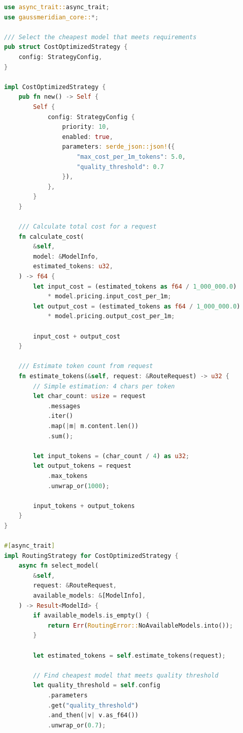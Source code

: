 \documentclass[12pt,a4paper,twoside]{report}
\begin{document}
\begin{lstlisting}[language=Rust,caption={Cost-Optimized Routing - crates/gaussmeridian-router/src/strategies/cost.rs}]
use async_trait::async_trait;
use gaussmeridian_core::*;

/// Select the cheapest model that meets requirements
pub struct CostOptimizedStrategy {
    config: StrategyConfig,
}

impl CostOptimizedStrategy {
    pub fn new() -> Self {
        Self {
            config: StrategyConfig {
                priority: 10,
                enabled: true,
                parameters: serde_json::json!({
                    "max_cost_per_1m_tokens": 5.0,
                    "quality_threshold": 0.7
                }),
            },
        }
    }
    
    /// Calculate total cost for a request
    fn calculate_cost(
        &self,
        model: &ModelInfo,
        estimated_tokens: u32,
    ) -> f64 {
        let input_cost = (estimated_tokens as f64 / 1_000_000.0)
            * model.pricing.input_cost_per_1m;
        let output_cost = (estimated_tokens as f64 / 1_000_000.0)
            * model.pricing.output_cost_per_1m;
        
        input_cost + output_cost
    }
    
    /// Estimate token count from request
    fn estimate_tokens(&self, request: &RouteRequest) -> u32 {
        // Simple estimation: 4 chars per token
        let char_count: usize = request
            .messages
            .iter()
            .map(|m| m.content.len())
            .sum();
        
        let input_tokens = (char_count / 4) as u32;
        let output_tokens = request
            .max_tokens
            .unwrap_or(1000);
        
        input_tokens + output_tokens
    }
}

#[async_trait]
impl RoutingStrategy for CostOptimizedStrategy {
    async fn select_model(
        &self,
        request: &RouteRequest,
        available_models: &[ModelInfo],
    ) -> Result<ModelId> {
        if available_models.is_empty() {
            return Err(RoutingError::NoAvailableModels.into());
        }
        
        let estimated_tokens = self.estimate_tokens(request);
        
        // Find cheapest model that meets quality threshold
        let quality_threshold = self.config
            .parameters
            .get("quality_threshold")
            .and_then(|v| v.as_f64())
            .unwrap_or(0.7);
        

\end{lstlisting}
\end{document}
